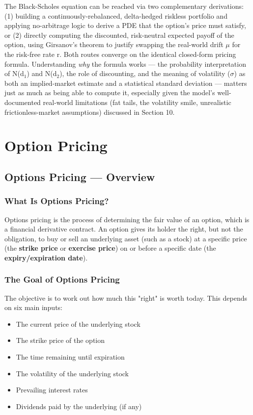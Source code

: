 \documentclass[12pt,openany]{book}
\theoremstyle{definition}
\theoremstyle{remark}
\begin{document}
The Black-Scholes equation can be reached via two complementary derivations: (1) building a continuously-rebalanced, delta-hedged riskless portfolio and applying no-arbitrage logic to derive a PDE that the option's price must satisfy, or (2) directly computing the discounted, risk-neutral expected payoff of the option, using Girsanov's theorem to justify swapping the real-world drift \(\mu\) for the risk-free rate r. Both routes converge on the identical closed-form pricing formula. Understanding \emph{why} the formula works --- the probability interpretation of N(d\(_1\)) and N(d\(_2\)), the role of discounting, and the meaning of volatility (\(\sigma\)) as both an implied-market estimate and a statistical standard deviation --- matters just as much as being able to compute it, especially given the model's well-documented real-world limitations (fat tails, the volatility smile, unrealistic frictionless-market assumptions) discussed in Section 10.

\chapter{Option Pricing}

\section{Options Pricing — Overview}

\subsection{What Is Options Pricing?}

Options pricing is the process of determining the fair value of an option, which is a financial derivative contract. An option gives its holder the right, but not the obligation, to buy or sell an underlying asset (such as a stock) at a specific price (the \textbf{strike price} or \textbf{exercise price}) on or before a specific date (the \textbf{expiry/expiration date}).

\subsection{The Goal of Options Pricing}

The objective is to work out how much this "right" is worth today. This depends on six main inputs:

\begin{itemize}
\item The current price of the underlying stock
\item The strike price of the option
\item The time remaining until expiration
\item The volatility of the underlying stock
\item Prevailing interest rates
\item Dividends paid by the underlying (if any)
\end{itemize}
\end{document}
